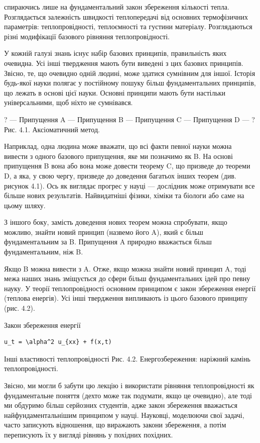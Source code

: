 \documentclass[
  ukrainian,
]{article}
\begin{document}
спираючись лише на фундаментальний закон збереження кількості тепла.
Розглядається залежність швидкості теплопередачі від основних
термофізичних параметрів: теплопровідності, теплоємності та густини
матеріалу. Розглядаються різні модифікації базового рівняння
теплопровідності.

У кожній галузі знань існує набір базових принципів, правильність яких
очевидна. Усі інші твердження мають бути виведені з цих базових
принципів. Звісно, те, що очевидно одній людині, може здатися сумнівним
для іншої. Історія будь-якої науки полягає у постійному пошуку більш
фундаментальних принципів, що лежать в основі цієї науки. Основні
принципи мають бути настільки універсальними, щоб ніхто не сумнівався.

? --- Припущення A --- Припущення B --- Припущення C --- Припущення D
--- ? Рис. 4.1. Аксіоматичний метод.

Наприклад, одна людина може вважати, що всі факти певної науки можна
вивести з одного базового припущення, яке ми позначимо як B. На основі
припущення B вона або вона може довести теорему C, що призведе до
теореми D, а яка, у свою чергу, призведе до доведення багатьох інших
теорем (див. рисунок 4.1). Ось як виглядає прогрес у науці --- дослідник
може отримувати все більше нових результатів. Найвидатніші фізики,
хіміки та біологи або саме на цьому шляху.

З іншого боку, замість доведення нових теорем можна спробувати, якщо
можливо, знайти новий принцип (назвемо його A), який є більш
фундаментальним за B. Припущення A природно вважається більш
фундаментальним, ніж B.

Якщо B можна вивести з A. Отже, якщо можна знайти новий принцип A, тоді
межа наших знань зміщується до сфери більш фундаментальних ідей про
певну науку. У теорії теплопровідності основним принципом є закон
збереження енергії (теплова енергія). Усі інші твердження випливають із
цього базового принципу (рис. 4.2).

Закон збереження енергії

\begin{verbatim}
u_t = \alpha^2 u_{xx} + f(x,t)
\end{verbatim}

Інші властивості теплопровідності Рис. 4.2. Енергозбереження: наріжний
камінь теплопровідності.

Звісно, ми могли б забути цю лекцію і використати рівняння
теплопровідності як фундаментальне поняття (дехто може так подумати,
якщо це очевидно), але тоді ми обдуримо більш серйозних студентів, адже
закон збереження вважається найфундаментальнішим принципом у науці.
Науковці, моделюючи свої задачі, часто записують відношення, що
виражають закони збереження, а потім переписують їх у вигляді рівнянь у
похідних похідних.
\end{document}
